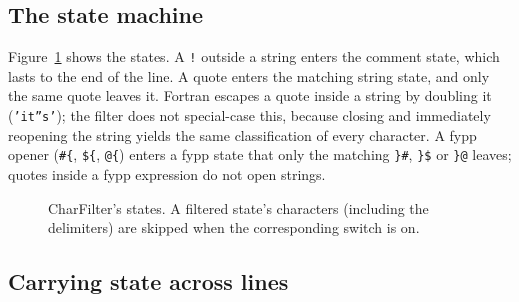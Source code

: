 \documentclass[11pt,a4paper,openany]{book}
\newcommand{\code}[1]{\texttt{\small #1}}
\begin{document}
\subsection{The state machine}

Figure~\ref{fig:charfilter} shows the states. A \code{!} outside a string
enters the comment state, which lasts to the end of the line. A quote enters
the matching string state, and only the same quote leaves it. Fortran escapes
a quote inside a string by doubling it (\code{'it''s'}); the filter does not
special-case this, because closing and immediately reopening the string yields
the same classification of every character. A fypp opener
(\code{\#\{}, \code{\$\{}, \code{@\{}) enters a fypp state that only the matching
\code{\}\#}, \code{\}\$} or \code{\}@} leaves; quotes inside a fypp expression do not
open strings.

\begin{figure}[ht]
\centering
{}
\caption{CharFilter's states. A filtered state's characters (including the
delimiters) are skipped when the corresponding switch is on.}
\label{fig:charfilter}
\end{figure}

\subsection{Carrying state across lines}
\end{document}
